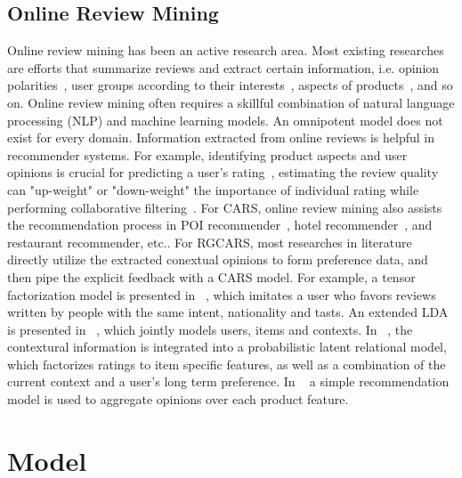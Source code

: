 \documentclass{llncs}
\begin{document}
\subsection{Online Review Mining}
Online review mining has been an active research area. Most existing researches are efforts that summarize reviews and extract certain information, i.e. opinion polarities~\cite{Liu2005Opinion}, user groups according to their interests~\cite{Si2014Users}, aspects of products~\cite{Moghaddam2013FLDA}, and so on. Online review mining often requires a skillful combination of natural language processing (NLP) and machine learning models. An omnipotent model does not exist for every domain.
Information extracted from online reviews is helpful in recommender systems. For example, identifying product aspects and user opinions is crucial for predicting a user's rating~\cite{Qu2010Bag}, estimating the review quality can "up-weight" or "down-weight" the importance of individual rating while performing collaborative filtering~\cite{Raghavan2012Review}. For CARS, online review mining also assists the recommendation process in POI recommender~\cite{Biancalana2013Approach}, hotel recommender~\cite{Levi2012Finding}, and restaurant recommender\cite{Li2010Contextual}, etc..
For RGCARS, most researches in literature directly utilize the extracted conextual opinions to form preference data, and then pipe the explicit feedback with a CARS model. For example, a tensor factorization model is presented in ~\cite{Levi2012Finding}, which imitates a user who favors reviews written by people with the same intent, nationality and tasts. An extended LDA is presented in ~\cite{Hariri2013Query}, which jointly models users, items and contexts. In ~\cite{Li2010Contextual}, the contextural information is integrated into a probabilistic latent relational model, which factorizes ratings to item specific features, as well as a combination of the current context and a user's long term preference. In ~\cite{Liu2013Combining} a simple recommendation model is used to aggregate opinions over each product feature.


\section{ Model}\label{sec:mnar}
\end{document}
